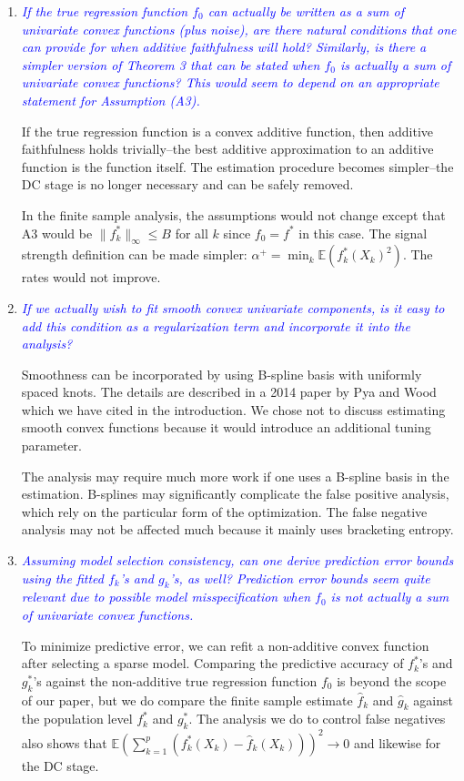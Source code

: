 \documentclass[pdftex,12pt]{article}
\let\hat\widehat
\def\rc#1{{\it\textcolor{blue}{#1}}\smallskip}
\begin{document}
\begin{enumerate}[(1)]
\item \rc{If the true regression function $f_0$ can actually be written as a
sum of univariate convex functions (plus noise), are there natural
conditions that one can provide for when additive faithfulness will
hold? Similarly, is there a simpler version of Theorem 3 that can be
stated when $f_0$ is actually a sum of univariate convex functions? This
would seem to depend on an appropriate statement for Assumption (A3).}

If the true regression function is a convex additive function, then additive faithfulness holds trivially--the best additive approximation to an additive function is the function itself. The estimation procedure becomes simpler--the DC stage is no longer necessary and can be safely removed. 

In the finite sample analysis, the assumptions would not change except that A3 would be $\| f^*_k \|_\infty \leq B$ for all $k$ since $f_0 = f^*$ in this case. The signal strength definition can be made simpler: $\alpha^+ = \min_k \mathbb{E}( f^*_k(X_k)^2 )$. The rates would not improve.


\item \rc{If we actually wish to fit smooth convex univariate components, is
it easy to add this condition as a regularization term and incorporate
it into the analysis?}

Smoothness can be incorporated by using B-spline basis with uniformly spaced knots. The details are described in a 2014 paper by Pya and Wood which we have cited in the introduction. We chose not to discuss estimating smooth convex functions because it would introduce an additional tuning parameter.

The analysis may require much more work if one uses a B-spline basis in the estimation. B-splines may significantly complicate the false positive analysis, which rely on the particular form of the optimization. The false negative analysis may not be affected much because it mainly uses bracketing entropy.

\item \rc{Assuming model selection consistency, can one derive prediction
error bounds using the fitted $f_k$'s and $g_k$'s, as well? Prediction error
bounds seem quite relevant due to possible model misspecification when
$f_0$ is not actually a sum of univariate convex functions.}

To minimize predictive error, we can refit a non-additive convex function after selecting a sparse model. Comparing the predictive accuracy of $f^*_k$'s and $g^*_k$'s against the non-additive true regression function $f_0$ is beyond the scope of our paper, but we do compare the finite sample estimate $\hat{f}_k$ and $\hat{g}_k$ against the population level $f^*_k$ and $g^*_k$. The analysis we do to control false negatives also shows that $\mathbb{E}\left(\sum_{k=1}^p (f^*_k(X_k) - \hat{f}_k(X_k))\right)^2 \rightarrow 0$ and likewise for the DC stage.


\end{enumerate}
\end{document}
